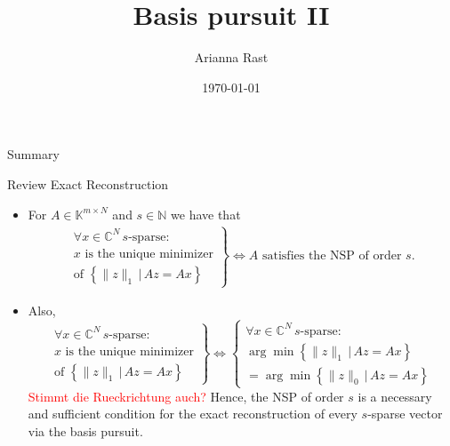 \documentclass[11pt]{beamer}
\author[Autor]{Arianna Rast}
\title{Basis pursuit II}
\institute[]{LMU Munich}
\date{\today}
\newcommand{\CC}{\mathbb{C}}
\newcommand{\NN}{\mathbb{N}}
\newcommand{\KK}{\mathbb{K}}
\begin{document}
\begin{frame}
\titlepage
\end{frame}

\begin{frame}{Summary}
\tableofcontents 
\end{frame}

\begin{frame}{Review Exact Reconstruction}
\begin{itemize}
	\item For \(A\in \KK^{m\times N}\) and \(s\in \NN\) we have that
	\begin{align*}
	\left.\begin{array}{c}
		\forall x\in \CC^N\,s\text{-sparse}:\\
		x\text{ is the unique minimizer} \\  \text{of }
		\left\{\|z\|_1\,\big|\, Az=Ax\right\}
	\end{array}\right\}
\iff  A\text{ satisfies the NSP of order }s.
\end{align*}
\item Also, 
\[\left.\begin{array}{c}
		\forall x\in \CC^N\,s\text{-sparse}:\\
		x\text{ is the unique minimizer} \\  \text{of }
		\left\{\|z\|_1\,\big|\, Az=Ax\right\}
	\end{array}\right\} \iff \left\{\begin{array}{c}
		\forall x\in \CC^N\,s\text{-sparse}:\\
		\arg\min\left\{\|z\|_1\,\big|\,Az=Ax\right\}\\
		=\arg\min\left\{\|z\|_0\,\big|\,Az=Ax\right\}
	\end{array}\right.
\]
\textcolor{red}{Stimmt die Rueckrichtung auch?}
Hence, the NSP of order \(s\) is a necessary and sufficient condition for the exact reconstruction of every \(s\)-sparse vector via the basis pursuit.
\end{itemize}
\end{frame}
\end{document}
